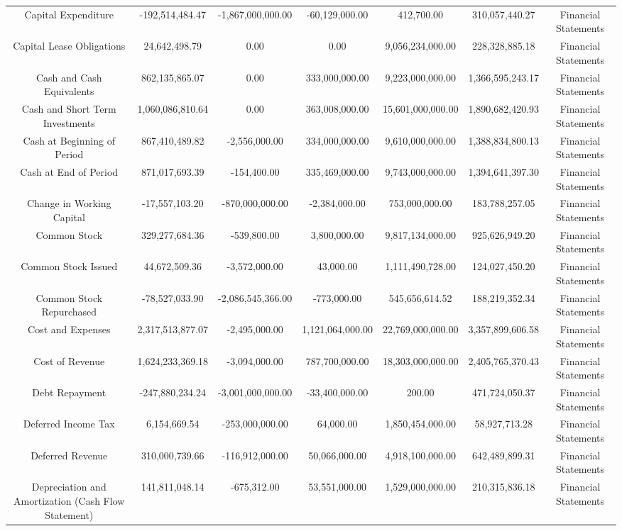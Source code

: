 \begin{longtable}{ccccccc}
Capital Expenditure & -192,514,484.47 & -1,867,000,000.00 & -60,129,000.00 & 412,700.00 & 310,057,440.27 & Financial Statements \\
Capital Lease Obligations & 24,642,498.79 & 0.00 & 0.00 & 9,056,234,000.00 & 228,328,885.18 & Financial Statements \\
Cash and Cash Equivalents & 862,135,865.07 & 0.00 & 333,000,000.00 & 9,223,000,000.00 & 1,366,595,243.17 & Financial Statements \\
Cash and Short Term Investments & 1,060,086,810.64 & 0.00 & 363,008,000.00 & 15,601,000,000.00 & 1,890,682,420.93 & Financial Statements \\
Cash at Beginning of Period & 867,410,489.82 & -2,556,000.00 & 334,000,000.00 & 9,610,000,000.00 & 1,388,834,800.13 & Financial Statements \\
Cash at End of Period & 871,017,693.39 & -154,400.00 & 335,469,000.00 & 9,743,000,000.00 & 1,394,641,397.30 & Financial Statements \\
Change in Working Capital & -17,557,103.20 & -870,000,000.00 & -2,384,000.00 & 753,000,000.00 & 183,788,257.05 & Financial Statements \\
Common Stock & 329,277,684.36 & -539,800.00 & 3,800,000.00 & 9,817,134,000.00 & 925,626,949.20 & Financial Statements \\
Common Stock Issued & 44,672,509.36 & -3,572,000.00 & 43,000.00 & 1,111,490,728.00 & 124,027,450.20 & Financial Statements \\
Common Stock Repurchased & -78,527,033.90 & -2,086,545,366.00 & -773,000.00 & 545,656,614.52 & 188,219,352.34 & Financial Statements \\
Cost and Expenses & 2,317,513,877.07 & -2,495,000.00 & 1,121,064,000.00 & 22,769,000,000.00 & 3,357,899,606.58 & Financial Statements \\
Cost of Revenue & 1,624,233,369.18 & -3,094,000.00 & 787,700,000.00 & 18,303,000,000.00 & 2,405,765,370.43 & Financial Statements \\
Debt Repayment & -247,880,234.24 & -3,001,000,000.00 & -33,400,000.00 & 200.00 & 471,724,050.37 & Financial Statements \\
Deferred Income Tax & 6,154,669.54 & -253,000,000.00 & 64,000.00 & 1,850,454,000.00 & 58,927,713.28 & Financial Statements \\
Deferred Revenue & 310,000,739.66 & -116,912,000.00 & 50,066,000.00 & 4,918,100,000.00 & 642,489,899.31 & Financial Statements \\
Depreciation and Amortization (Cash Flow Statement) & 141,811,048.14 & -675,312.00 & 53,551,000.00 & 1,529,000,000.00 & 210,315,836.18 & Financial Statements \\

\end{longtable}
